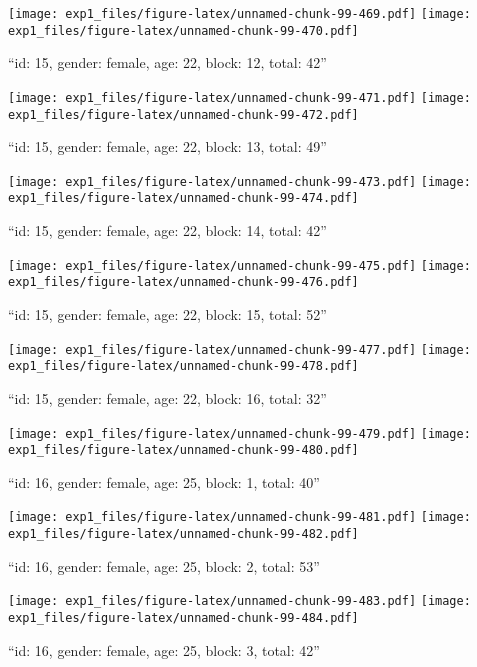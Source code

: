 \documentclass[,]{article}
\begin{document}
\texttt{[image: exp1\_files/figure-latex/unnamed-chunk-99-469.pdf]}
\texttt{[image: exp1\_files/figure-latex/unnamed-chunk-99-470.pdf]}

\newpage
[1] 

``id: 15, gender: female, age: 22, block: 12, total: 42''

\texttt{[image: exp1\_files/figure-latex/unnamed-chunk-99-471.pdf]}
\texttt{[image: exp1\_files/figure-latex/unnamed-chunk-99-472.pdf]}

\newpage
[1] 

``id: 15, gender: female, age: 22, block: 13, total: 49''

\texttt{[image: exp1\_files/figure-latex/unnamed-chunk-99-473.pdf]}
\texttt{[image: exp1\_files/figure-latex/unnamed-chunk-99-474.pdf]}

\newpage
[1] 

``id: 15, gender: female, age: 22, block: 14, total: 42''

\texttt{[image: exp1\_files/figure-latex/unnamed-chunk-99-475.pdf]}
\texttt{[image: exp1\_files/figure-latex/unnamed-chunk-99-476.pdf]}

\newpage
[1] 

``id: 15, gender: female, age: 22, block: 15, total: 52''

\texttt{[image: exp1\_files/figure-latex/unnamed-chunk-99-477.pdf]}
\texttt{[image: exp1\_files/figure-latex/unnamed-chunk-99-478.pdf]}

\newpage
[1] 

``id: 15, gender: female, age: 22, block: 16, total: 32''

\texttt{[image: exp1\_files/figure-latex/unnamed-chunk-99-479.pdf]}
\texttt{[image: exp1\_files/figure-latex/unnamed-chunk-99-480.pdf]}

\newpage
[1] 

``id: 16, gender: female, age: 25, block: 1, total: 40''

\texttt{[image: exp1\_files/figure-latex/unnamed-chunk-99-481.pdf]}
\texttt{[image: exp1\_files/figure-latex/unnamed-chunk-99-482.pdf]}

\newpage
[1] 

``id: 16, gender: female, age: 25, block: 2, total: 53''

\texttt{[image: exp1\_files/figure-latex/unnamed-chunk-99-483.pdf]}
\texttt{[image: exp1\_files/figure-latex/unnamed-chunk-99-484.pdf]}

\newpage
[1] 

``id: 16, gender: female, age: 25, block: 3, total: 42''
\end{document}
